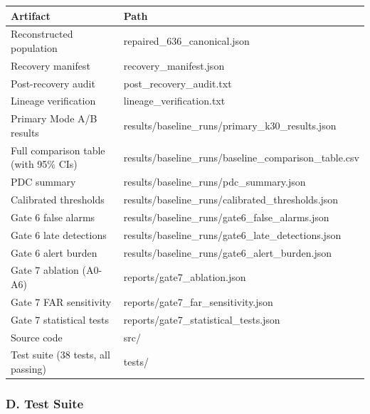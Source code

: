 \documentclass[
]{article}
\newcounter{none} %
\begin{document}
{\def\LTcaptype{none} %
\begin{longtable}[]{@{}
  >{\raggedright\arraybackslash}p{}
  >{\raggedright\arraybackslash}p{}@{}}
\toprule\noalign{}
\begin{minipage}[b]{\linewidth}\raggedright
Artifact
\end{minipage} & \begin{minipage}[b]{\linewidth}\raggedright
Path
\end{minipage} \\
\midrule\noalign{}
\endhead
\bottomrule\noalign{}
\endlastfoot
Reconstructed population & repaired\_636\_canonical.json \\
Recovery manifest & recovery\_manifest.json \\
Post-recovery audit & post\_recovery\_audit.txt \\
Lineage verification & lineage\_verification.txt \\
Primary Mode A/B results &
results/baseline\_runs/primary\_k30\_results.json \\
Full comparison table (with 95\% CIs) &
results/baseline\_runs/baseline\_comparison\_table.csv \\
PDC summary & results/baseline\_runs/pdc\_summary.json \\
Calibrated thresholds &
results/baseline\_runs/calibrated\_thresholds.json \\
Gate 6 false alarms &
results/baseline\_runs/gate6\_false\_alarms.json \\
Gate 6 late detections &
results/baseline\_runs/gate6\_late\_detections.json \\
Gate 6 alert burden &
results/baseline\_runs/gate6\_alert\_burden.json \\
Gate 7 ablation (A0-A6) & reports/gate7\_ablation.json \\
Gate 7 FAR sensitivity & reports/gate7\_far\_sensitivity.json \\
Gate 7 statistical tests & reports/gate7\_statistical\_tests.json \\
Source code & src/ \\
Test suite (38 tests, all passing) & tests/ \\
\end{longtable}
}

\subsubsection{D. Test Suite}\label{d.-test-suite}
\end{document}
